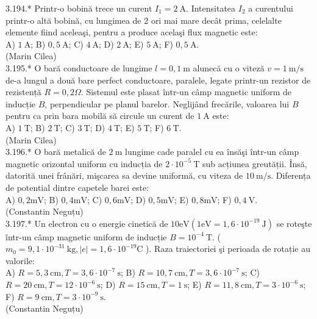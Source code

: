 3.194.* Printr-o bobină trece un curent $I_{1}=2 \mathrm{~A}$. Intensitatea $I_{2}$ a curentului printr-o altă bobină, cu lungimea de 2 ori mai mare decât prima, celelalte elemente fiind aceleaşi, pentru a produce acelaşi flux magnetic este:\\ A) $1 \mathrm{~A}$; B) $0,5 \mathrm{~A}$; C) $4 \mathrm{~A}$; D) $2 \mathrm{~A}$; E) $5 \mathrm{~A}$; F) $0,5 \mathrm{~A}$.\\ (Marin Cilea)\\

3.195.* O bară conductoare de lungime $l=0,1 \mathrm{~m}$ alunecă cu o viteză $v=1 \mathrm{~m} / \mathrm{s}$ de-a lungul a două bare perfect conductoare, paralele, legate printr-un rezistor de rezistență $R=0,2 \Omega$. Sistemul este plasat într-un câmp magnetic uniform de inducție $B$, perpendicular pe planul barelor. Neglijând frecările, valoarea lui $B$ pentru ca prin bara mobilă să circule un curent de $1 \mathrm{~A}$ este:\\ A) $1 \mathrm{~T}$; B) $2 \mathrm{~T}$; C) $3 \mathrm{~T}$; D) $4 \mathrm{~T}$; E) $5 \mathrm{~T}$; F) $6 \mathrm{~T}$.\\ (Marin Cilea)\\

3.196.* O bară metalică de $2 \mathrm{~m}$ lungime cade paralel cu ea însăşi într-un câmp magnetic orizontal uniform cu inducția de $2 \cdot 10^{-5} \mathrm{~T}$ sub acțiunea greutății. Însă, datorită unei frânări, mişcarea sa devine uniformă, cu viteza de $10 \mathrm{~m} / \mathrm{s}$. Diferența de potential dintre capetele barei este:\\ A) $0,2 \mathrm{mV}$; B) $0,4 \mathrm{mV}$; C) $0,6 \mathrm{mV}$; D) $0,5 \mathrm{mV}$; E) $0,8 \mathrm{mV}$; F) $0,4 \mathrm{~V}$.\\ (Constantin Neguțu)\\

3.197.* Un electron cu o energie cinetică de $10 \mathrm{eV}\left(1 \mathrm{eV}=1,6 \cdot 10^{-19} \mathrm{~J}\right)$ se roteşte într-un câmp magnetic uniform de inducție $B=10^{-4} \mathrm{~T}$. ( $m_{0}=9,1 \cdot 10^{-31} \mathrm{~kg},|e|=1,6 \cdot 10^{-19} \mathrm{C}$ ). Raza traiectoriei şi perioada de rotație au valorile:\\ A) $R=5,3 \mathrm{~cm}, T=3,6 \cdot 10^{-7} \mathrm{~s}$; B) $R=10,7 \mathrm{~cm}, T=3,6 \cdot 10^{-7} \mathrm{~s}$; C) $R=20 \mathrm{~cm}, T=12 \cdot 10^{-6} \mathrm{~s}$; D) $R=15 \mathrm{~cm}, T=1 \mathrm{~s}$; E) $R=11,8 \mathrm{~cm}, T=3 \cdot 10^{-6} \mathrm{~s}$; F) $R=9 \mathrm{~cm}, T=3 \cdot 10^{-9} \mathrm{~s}$.\\ (Constantin Neguțu)\\

